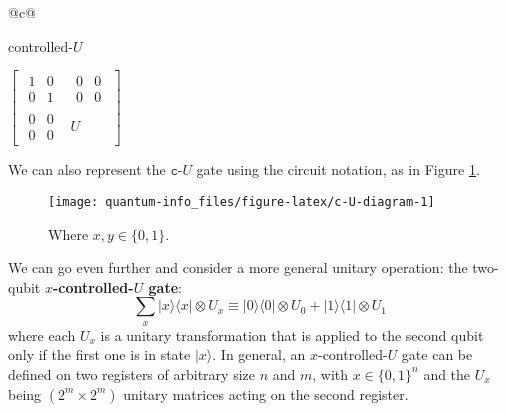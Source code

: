 \documentclass[fleqn]{article}
\renewcommand{\toprule}{}
\renewcommand{\midrule}{}
\renewcommand{\bottomrule}{}
\newenvironment{idea}{\noindent}{\medskip}
\begin{document}
\begin{idea}

\begin{longtable}[]{@{}c@{}}
\toprule
\begin{minipage}[b]{(\columnwidth - 0\tabcolsep) * \real{1.00}}\centering
controlled-\(U\)\strut
\end{minipage}\tabularnewline
\midrule
\endhead
\begin{minipage}[t]{(\columnwidth - 0\tabcolsep) * \real{1.00}}\centering
\(\left[\begin{array}{c|c}\begin{matrix}1&0\\0&1\end{matrix}&\begin{matrix}0&0\\0&0\end{matrix}\\\hline\begin{matrix}0&0\\0&0\end{matrix}&U\end{array}\right]\)\strut
\end{minipage}\tabularnewline
\bottomrule
\end{longtable}

\end{idea}

We can also represent the \(\texttt{c-}U\) gate using the circuit notation, as in Figure \ref{fig:c-U-diagram}.



\begin{figure}[H]

{\centering \texttt{[image: quantum-info\_files/figure-latex/c-U-diagram-1]} 

}

\caption{Where \(x,y\in\{0,1\}\).}\label{fig:c-U-diagram}
\end{figure}

We can go even further and consider a more general unitary operation: the two-qubit \textbf{\(x\)-controlled-\(U\) gate}:
\[
  \sum_x |x\rangle\langle x|\otimes U_x
  \equiv
  |0\rangle\langle 0|\otimes U_0 + |1\rangle\langle 1|\otimes U_1
\]
where each \(U_x\) is a unitary transformation that is applied to the second qubit only if the first one is in state \(|x\rangle\).
In general, an \(x\)-controlled-\(U\) gate can be defined on two registers of arbitrary size \(n\) and \(m\), with \(x\in\{0,1\}^n\) and the \(U_x\) being \((2^m\times 2^m)\) unitary matrices acting on the second register.
\end{document}
